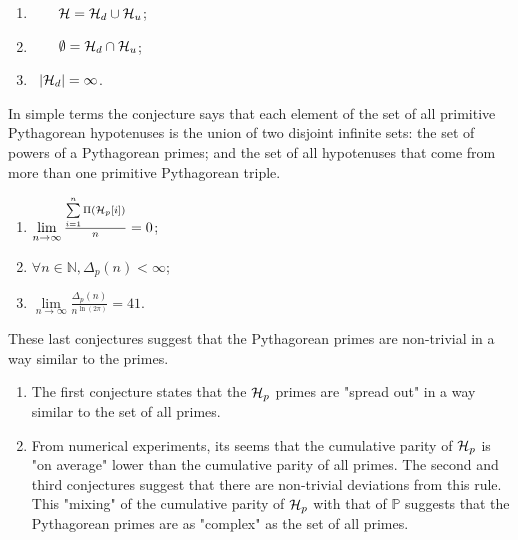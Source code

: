 \documentclass{article}
\theoremstyle{definition}
\begin{document}
\begin{enumerate}
  \item{$\hphantom{|{\cal H}_d|}{\cal H} = {\cal H}_{d} \cup {\cal H}_u$;}
  \item{$\hphantom{|{\cal H}_d|}\emptyset = {\cal H}_{d} \cap {\cal H}_u$};
  \item{$\hphantom{\emptyset}|{\cal H}_d| = \infty$.}
\end{enumerate}

In simple terms the conjecture says that each element of the set of all 
primitive Pythagorean hypotenuses is the union of two disjoint infinite sets:
the set of powers of a Pythagorean primes; and the set of all hypotenuses 
that come from more than one primitive Pythagorean triple.

\begin{enumerate}
  \item{$\lim\limits_{n \rightarrow \infty} \frac{\sum\limits_{i=1}^n \Pi({\cal H}_p[i])}{n} = 0$;}
  \item{$\forall n\in \mathbb{N}, \Delta_p(n) < \infty$;}
  \item{$ \lim\limits_{n \rightarrow \infty} \frac{\Delta_p(n)}{n^{\ln(2 \pi)}} = 41$.}
\end{enumerate}

These last conjectures suggest that the Pythagorean primes are non-trivial 
in a way similar to the primes.
\begin{enumerate}
  \item{The first conjecture states that the ${\cal H}_p$ primes are 
      "spread out" in a way similar to the set of all primes.}
  \item{From numerical experiments, its seems that the cumulative parity 
      of ${\cal H}_p$ is "on average" lower than the cumulative parity of all primes.
      The second and third conjectures suggest that there 
      are non-trivial deviations from this rule. This "mixing" of the 
        cumulative parity of ${\cal H}_p$ with that of $\mathbb{P}$ 
      suggests that the Pythagorean primes are as "complex" as the set of 
        all primes.}
\end{enumerate}
\end{document}
